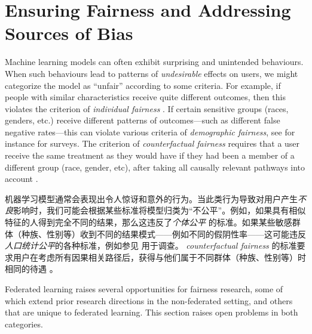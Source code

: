 
\section{Ensuring Fairness and Addressing Sources of Bias} \label{sec:fairness}


Machine learning models can often exhibit surprising and unintended behaviours. When such behaviours lead to patterns of {\em undesirable} effects on users, we might categorize the model as ``unfair'' according to some criteria. For example, if people with similar characteristics receive quite different outcomes, then this violates the criterion of {\em individual fairness} \cite{dwork2012fairness}. If certain sensitive groups (races, genders, etc.) receive different patterns of outcomes---such as different false negative rates---this can violate various criteria of {\em demographic fairness}, see for instance \cite{barocasfairness, mitchell2018prediction} for surveys. The criterion of {\em counterfactual fairness} requires that a user  receive the same treatment as they would have if they had been a member of a different group (race, gender, etc), after taking all causally relevant pathways into account \cite{kusner2017counterfactual}.

机器学习模型通常会表现出令人惊讶和意外的行为。当此类行为导致对用户产生{\em 不良}影响时，我们可能会根据某些标准将模型归类为“不公平”。例如，如果具有相似特征的人得到完全不同的结果，那么这违反了{\em 个体公平} \cite{dwork2012fairness} 的标准。如果某些敏感群体（种族、性别等）收到不同的结果模式——例如不同的假阴性率——这可能违反{\em 人口统计公平}的各种标准，例如参见 \cite{barocasfairness, mitchell2018prediction} 用于调查。 {\em counterfactual fairness} 的标准要求用户在考虑所有因果相关路径后，获得与他们属于不同群体（种族、性别等）时相同的待遇 \cite{ kusner2017counterfactual}。

Federated learning raises several opportunities for fairness research, some of which extend prior research directions in the non-federated setting, and others that are unique to federated learning. This section raises open problems in both categories.

